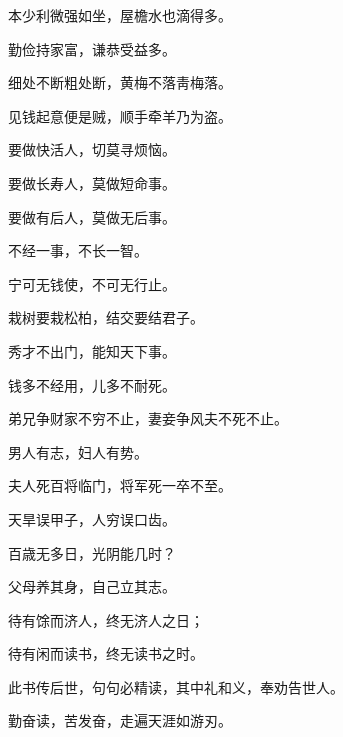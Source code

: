 \documentclass[12pt,oneside]{book}
\begin{document}
本少利微强如坐，屋檐水也滴得多。

勤俭持家富，谦恭受益多。

细处不断粗处断，黄梅不落靑梅落。

见钱起意便是贼，顺手牵羊乃为盗。

要做快活人，切莫寻烦恼。

要做长寿人，莫做短命事。

要做有后人，莫做无后事。

不经一事，不长一智。

宁可无钱使，不可无行止。

栽树要栽松柏，结交要结君子。

秀才不出门，能知天下事。

钱多不经用，儿多不耐死。

弟兄争财家不穷不止，妻妾争风夫不死不止。

男人有志，妇人有势。

夫人死百将临门，将军死一卒不至。

天旱误甲子，人穷误口齿。

百歳无多日，光阴能几时？

父母养其身，自己立其志。

待有馀而济人，终无济人之日；

待有闲而读书，终无读书之时。

此书传后世，句句必精读，其中礼和义，奉劝告世人。

勤奋读，苦发奋，走遍天涯如游刃。








\end{document}
